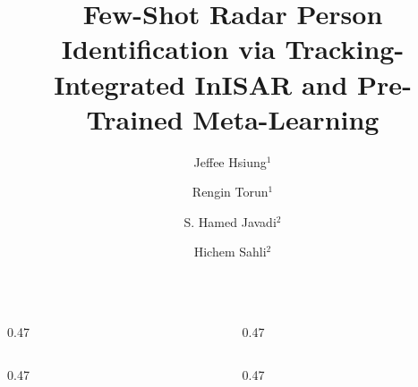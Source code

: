 \documentclass[english, xcolor=table]{beamer}
\title{Few-Shot Radar Person Identification via 
Tracking-Integrated InISAR and Pre-Trained Meta-Learning}
\author{Jeffee Hsiung$^{1}$ \and Rengin Torun$^{1}$ \and S. Hamed Javadi$^{2}$ \and Hichem Sahli$^{2}$}
\institute{$^{1}$KU Leuven, $^{2}$Other University}
\begin{document}
\begin{frame}[t]
\vspace{0.5cm}

  \begin{columns}[t,totalwidth=0.95\paperwidth]
    \begin{column}{0.47\paperwidth}
      
      
      
    \end{column}
    \begin{column}{0.47\paperwidth}
      
      
    \end{column}
  \end{columns}

  \vspace{0.3cm}

  \begin{columns}[t,totalwidth=0.95\paperwidth]
    \begin{column}{0.47\paperwidth}
      
    \end{column}
    \begin{column}{0.47\paperwidth}
      
    \end{column}
  \end{columns}

\end{frame}
\end{document}

